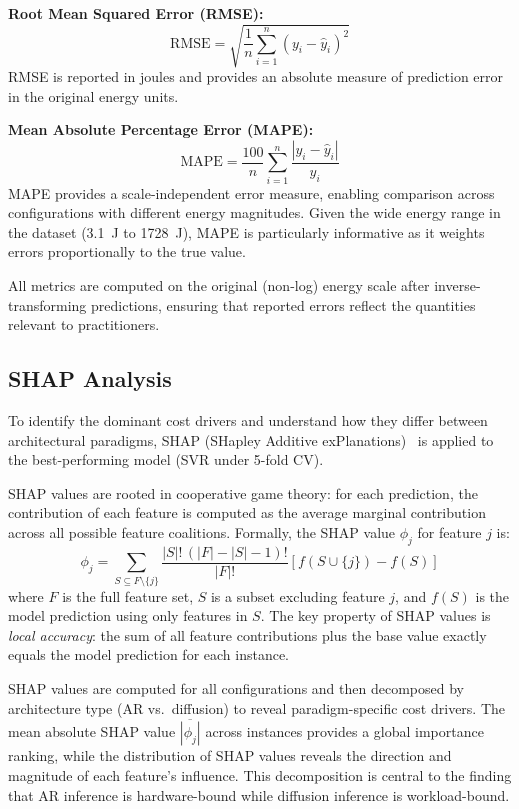 \documentclass[review,12pt,authoryear]{elsarticle}
\begin{document}
\textbf{Root Mean Squared Error (RMSE):}
\begin{equation}
\text{RMSE} = \sqrt{\frac{1}{n}\sum_{i=1}^{n}(y_i - \hat{y}_i)^2}
\label{eq:rmse}
\end{equation}
RMSE is reported in joules and provides an absolute measure of prediction error in the original energy units.

\textbf{Mean Absolute Percentage Error (MAPE):}
\begin{equation}
\text{MAPE} = \frac{100}{n}\sum_{i=1}^{n}\frac{|y_i - \hat{y}_i|}{y_i}
\label{eq:mape}
\end{equation}
MAPE provides a scale-independent error measure, enabling comparison across configurations with different energy magnitudes.
Given the wide energy range in the dataset (\SI{3.1}{\joule} to \SI{1728}{\joule}), MAPE is particularly informative as it weights errors proportionally to the true value.

All metrics are computed on the original (non-log) energy scale after inverse-transforming predictions, ensuring that reported errors reflect the quantities relevant to practitioners.

\subsection{SHAP Analysis}
\label{sec:shap_method}
To identify the dominant cost drivers and understand how they differ between architectural paradigms, SHAP (SHapley Additive exPlanations)~\citep{lundberg2017shap} is applied to the best-performing model (SVR under 5-fold CV).

SHAP values are rooted in cooperative game theory: for each prediction, the contribution of each feature is computed as the average marginal contribution across all possible feature coalitions.
Formally, the SHAP value $\phi_j$ for feature $j$ is:
\begin{equation}
\phi_j = \sum_{S \subseteq F \setminus \{j\}} \frac{|S|!\,(|F|-|S|-1)!}{|F|!} \left[ f(S \cup \{j\}) - f(S) \right]
\label{eq:shap}
\end{equation}
where $F$ is the full feature set, $S$ is a subset excluding feature $j$, and $f(S)$ is the model prediction using only features in $S$.
The key property of SHAP values is \emph{local accuracy}: the sum of all feature contributions plus the base value exactly equals the model prediction for each instance.

SHAP values are computed for all configurations and then decomposed by architecture type (AR vs.\ diffusion) to reveal paradigm-specific cost drivers.
The mean absolute SHAP value $\overline{|\phi_j|}$ across instances provides a global importance ranking, while the distribution of SHAP values reveals the direction and magnitude of each feature's influence.
This decomposition is central to the finding that AR inference is hardware-bound while diffusion inference is workload-bound.
\end{document}
